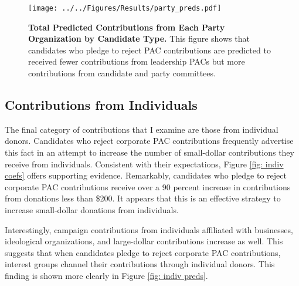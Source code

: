\documentclass[12pt]{article}
\begin{document}
\begin{figure*}[!htb]
	\centering
	\texttt{[image: ../../Figures/Results/party\_preds.pdf]}
	\caption{\textbf{Total Predicted Contributions from Each Party Organization by Candidate Type.} This figure shows that candidates who pledge to reject PAC contributions are predicted to received fewer contributions from leadership PACs but more contributions from candidate and party committees.}
	\label{fig: party preds}
\end{figure*}

\subsection{Contributions from Individuals}

The final category of contributions that I examine are those from individual donors. Candidates who reject corporate PAC contributions frequently advertise this fact in an attempt to increase the number of small-dollar contributions they receive from individuals. Consistent with their expectations, Figure \ref{fig: indiv coefs} offers supporting evidence. Remarkably, candidates who pledge to reject corporate PAC contributions receive over a 90 percent increase in contributions from donations less than \$200. It appears that this is an effective strategy to increase small-dollar donations from individuals. 

Interestingly, campaign contributions from individuals affiliated with businesses, ideological organizations, and large-dollar contributions increase as well. This suggests that when candidates pledge to reject corporate PAC contributions, interest groups channel their contributions through individual donors. This finding is shown more clearly in Figure \ref{fig: indiv preds}. 
\end{document}
